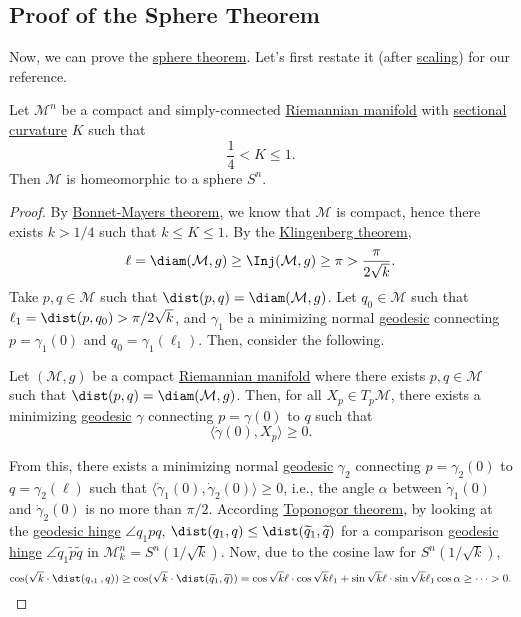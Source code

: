 \subsection{Proof of the Sphere Theorem}
Now, we can prove the \hyperref[thm:sphere]{sphere theorem}. Let's first restate it (after \hyperref[rmk:sphere-theorem-scaling]{scaling}) for our reference.

\begin{theorem}\label{thm:sphere*}
	Let \(\mathcal{M} ^n\) be a compact and simply-connected \hyperref[def:Riemannian-manifold]{Riemannian manifold} with \hyperref[def:sectional-curvature]{sectional curvature} \(K\) such that
	\[
		\frac{1}{4} < K \leq 1.
	\]
	Then \(\mathcal{M} \) is homeomorphic to a sphere \(S^n\).
\end{theorem}
\begin{proof}\let\qed\relax
	By \hyperref[thm:Bonnet-Mayers]{Bonnet-Mayers theorem}, we know that \(\mathcal{M} \) is compact, hence there exists \(k > 1 / 4\) such that \(k \leq K \leq 1\). By the \hyperref[thm:Klingenberg]{Klingenberg theorem},
	\[
		\ell
		= \diam(\mathcal{M} , g)
		\geq \Inj(\mathcal{M} , g)
		\geq \pi
		> \frac{\pi}{2 \sqrt{k} }.
	\]
	Take \(p, q\in \mathcal{M} \) such that \(\dist(p, q) = \diam(\mathcal{M} , g)\). Let \(q_0 \in \mathcal{M} \) such that \(\ell _1 = \dist(p, q_0) > \pi / 2 \sqrt{k} \), and \(\gamma _1\) be a minimizing normal \hyperref[def:geodesic]{geodesic} connecting \(p = \gamma _1(0)\) and \(q_0 = \gamma _1(\ell _1)\). Then, consider the following.
	\begin{lemma}
		Let \((\mathcal{M} , g)\) be a compact \hyperref[def:Riemannian-manifold]{Riemannian manifold} where there exists \(p, q\in \mathcal{M} \) such that \(\dist(p, q) = \diam(\mathcal{M} , g) \). Then, for all \(X_p \in T_p \mathcal{M} \), there exists a minimizing \hyperref[def:geodesic]{geodesic} \(\gamma \) connecting \(p=\gamma (0)\) to \(q\) such that
		\[
			\langle \dot{\gamma }(0) , X_p \rangle \geq 0.
		\]
	\end{lemma}
	From this, there exists a minimizing normal \hyperref[def:geodesic]{geodesic} \(\gamma _2\) connecting \(p=\gamma _2(0)\) to \(q = \gamma _2(\ell )\) such that \(\langle \dot{\gamma }_1(0), \dot{\gamma }_2(0) \rangle \geq 0\), i.e., the angle \(\alpha \) between \(\dot{\gamma } _1 (0) \) and \(\dot{\gamma } _2 (0)\) is no more than \(\pi / 2\). According \hyperref[thm:Toponogor]{Toponogor theorem}, by looking at the \hyperref[def:geodesic-hinge]{geodesic hinge} \(\angle q_1 p q\), \(\dist(q_1, q) \leq \dist(\widetilde{q} _1, \widetilde{q} )\) for a comparison \hyperref[def:geodesic-hinge]{geodesic hinge} \(\angle \widetilde{q} _1 \widetilde{p} \widetilde{q} \) in \(\mathcal{M} _k^n= S^n(1 / \sqrt{k} )\). Now, due to the cosine law for \(S^n(1 / \sqrt{k} )\),
	\[
		\cos (\sqrt{k}\cdot \dist(q,_1, q) )
		\geq \cos (\sqrt{k}\cdot \dist(\widetilde{q} _1, \widetilde{q} ) )
		= \cos \sqrt{k} \ell \cdot \cos \sqrt{k} \ell _1 + \sin \sqrt{k} \ell \cdot \sin \sqrt{k} \ell _1\cos \alpha
		\geq \dots
		> 0.
	\]
\end{proof}